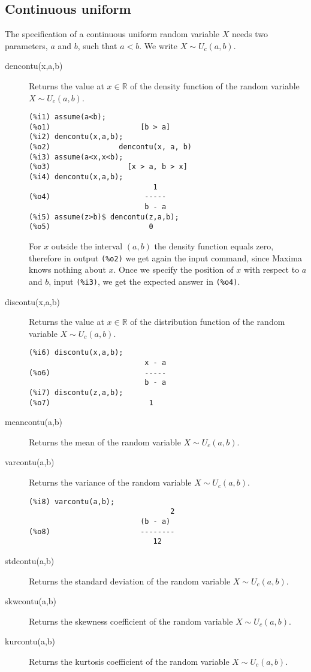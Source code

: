 \documentclass[12pt,a4paper]{article}
\newcommand{\R}{\mathbb{R}}
\begin{document}
\subsection{Continuous uniform}

The specification of a continuous uniform random variable $X$ needs two parameters, $a$ and $b$, such that $a<b$. We write $X \sim U_c(a,b)$.

\begin{description}

\item[dencontu(x,a,b)] Returns the value at $x \in \R$ of the density function of the random variable $X \sim U_c(a,b)$.

\begin{verbatim}
(%i1) assume(a<b);
(%o1)                     [b > a]
(%i2) dencontu(x,a,b);
(%o2)                dencontu(x, a, b)
(%i3) assume(a<x,x<b);
(%o3)                  [x > a, b > x]
(%i4) dencontu(x,a,b);
                             1
(%o4)                      -----
                           b - a
(%i5) assume(z>b)$ dencontu(z,a,b);
(%o5)                       0
\end{verbatim}
For $x$ outside the interval $(a,b)$ the density function equals zero, therefore in output \verb|(%o2)| we get again the input command, since Maxima knows nothing about $x$. Once we specify the position of $x$ with respect to $a$ and $b$, input \verb|(%i3)|, we get the expected answer in \verb|(%o4)|.

\item[discontu(x,a,b)] Returns the value at $x \in \R$ of the distribution function of the random variable $X \sim U_c(a,b)$.

\begin{verbatim}
(%i6) discontu(x,a,b);
                           x - a
(%o6)                      -----
                           b - a
(%i7) discontu(z,a,b);
(%o7)                       1
\end{verbatim}

\item[meancontu(a,b)] Returns the mean of the random variable  $X \sim U_c(a,b)$.

\item[varcontu(a,b)] Returns the variance of the random variable  $X \sim U_c(a,b)$.

\begin{verbatim}
(%i8) varcontu(a,b);
                                 2
                          (b - a)
(%o8)                     --------
                             12
\end{verbatim}

\item[stdcontu(a,b)] Returns the standard deviation of the random variable  $X \sim U_c(a,b)$.

\item[skwcontu(a,b)] Returns the skewness coefficient of the random variable  $X \sim U_c(a,b)$.

\item[kurcontu(a,b)] Returns the kurtosis coefficient of the random variable  $X \sim U_c(a,b)$.

\end{description}
\end{document}

